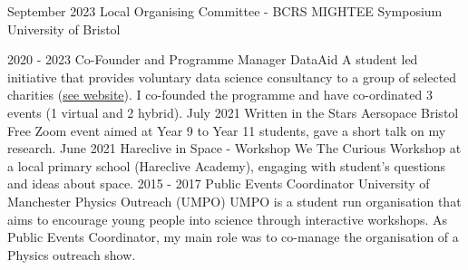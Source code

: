\documentclass[9pt]{developercv} %
\begin{document}
\vspace{-15 pt}
\begin{entrylist}
    \entry
            {September 2023}
            {Local Organising Committee - \textnormal{BCRS MIGHTEE Symposium}}
            {University of Bristol}
            {}
\end{entrylist}

\vspace{-10 pt}
\begin{entrylist}
    \entry
		{2020 - 2023}
		{Co-Founder and Programme Manager}
		{DataAid}
		{A student led initiative that provides voluntary data science consultancy to a group of selected charities ({\href{https://cdt-aimlac.org/cdt-data-aid.html}{see website}}). I co-founded the programme and have co-ordinated 3 events (1 virtual and 2 hybrid).}
    \entry
            {July 2021}
            {Written in the Stars}
            {Aersopace Bristol}
            {Free Zoom event aimed at Year 9 to Year 11 students, gave a short talk on my research.}
    \entry
            {June 2021}
            {Hareclive in Space - Workshop}
            {We The Curious}
            {Workshop at a local primary school (Hareclive Academy), engaging with student's questions and ideas about space.}
      \entry
		{2015 - 2017}
		{Public Events Coordinator}
		{University of Manchester Physics Outreach (UMPO)}
		{UMPO is a student run organisation that aims to encourage young people into      science through interactive workshops. As Public Events Coordinator, my main    role was to co-manage the organisation of a Physics outreach show.}
\end{entrylist}

\vspace{-10 pt}
    \vspace{-6pt}
    
\end{document}
